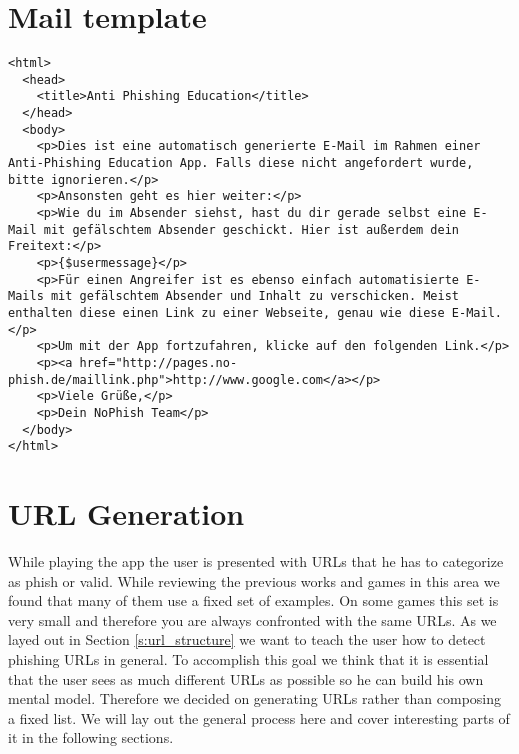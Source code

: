 \section{Mail template}
\label{a:mail}
\lstset{language=html}
\begin{lstlisting}
<html>
  <head>
    <title>Anti Phishing Education</title>
  </head>
  <body>
    <p>Dies ist eine automatisch generierte E-Mail im Rahmen einer Anti-Phishing Education App. Falls diese nicht angefordert wurde, bitte ignorieren.</p>
    <p>Ansonsten geht es hier weiter:</p>
    <p>Wie du im Absender siehst, hast du dir gerade selbst eine E-Mail mit gefälschtem Absender geschickt. Hier ist außerdem dein Freitext:</p>
    <p>{$usermessage}</p>
    <p>Für einen Angreifer ist es ebenso einfach automatisierte E-Mails mit gefälschtem Absender und Inhalt zu verschicken. Meist enthalten diese einen Link zu einer Webseite, genau wie diese E-Mail.</p>
    <p>Um mit der App fortzufahren, klicke auf den folgenden Link.</p>
    <p><a href="http://pages.no-phish.de/maillink.php">http://www.google.com</a></p>
    <p>Viele Grüße,</p>
    <p>Dein NoPhish Team</p>
  </body>
</html>
\end{lstlisting}

\section{URL Generation}
\label{s:url_generation}
While playing the app the user is presented with URLs that he has to categorize as phish or valid.
While reviewing the previous works and games in this area we found that many of them use a fixed set of examples.
On some games this set is very small and therefore you are always confronted with the same URLs.
As we layed out in Section \autoref{s:url_structure} we want to teach the user how to detect phishing URLs in general.
To accomplish this goal we think that it is essential that the user sees as much different URLs as possible so he can build his own mental model.
Therefore we decided on generating URLs rather than composing a fixed list.
We will lay out the general process here and cover interesting parts of it in the following sections.
